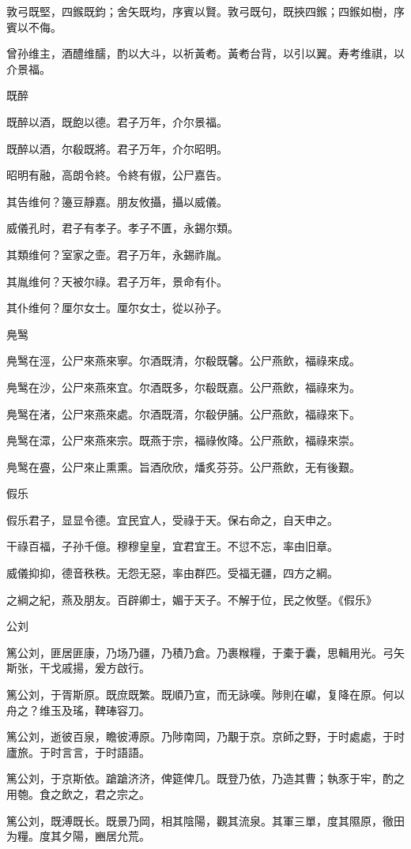 敦弓既堅，四鍭既鈞；舍矢既均，序賓以賢。敦弓既句，既挾四鍭；四鍭如樹，序賓以不侮。

曾孙维主，酒醴维醹，酌以大斗，以祈黃耇。黃耇台背，以引以翼。寿考维祺，以介景福。

既醉

既醉以酒，既飽以德。君子万年，介尔景福。

既醉以酒，尔殽既將。君子万年，介尔昭明。

昭明有融，高朗令終。令終有俶，公尸嘉告。

其告维何？籩豆靜嘉。朋友攸攝，攝以威儀。

威儀孔时，君子有孝子。孝子不匱，永錫尔類。

其類维何？室家之壸。君子万年，永錫祚胤。

其胤维何？天被尔祿。君子万年，景命有仆。

其仆维何？厘尔女士。厘尔女士，從以孙子。

鳧鹥

鳧鹥在涇，公尸來燕來寧。尔酒既清，尔殽既馨。公尸燕飲，福祿來成。

鳧鹥在沙，公尸來燕來宜。尔酒既多，尔殽既嘉。公尸燕飲，福祿來为。

鳧鹥在渚，公尸來燕來處。尔酒既湑，尔殽伊脯。公尸燕飲，福祿來下。

鳧鹥在潀，公尸來燕來宗。既燕于宗，福祿攸降。公尸燕飲，福祿來崇。

鳧鹥在亹，公尸來止熏熏。旨酒欣欣，燔炙芬芬。公尸燕飲，无有後艱。

假乐

假乐君子，显显令德。宜民宜人，受祿于天。保右命之，自天申之。

干祿百福，子孙千億。穆穆皇皇，宜君宜王。不愆不忘，率由旧章。

威儀抑抑，德音秩秩。无怨无惡，率由群匹。受福无疆，四方之綱。

之綱之紀，燕及朋友。百辟卿士，媚于天子。不解于位，民之攸墍。《假乐》

公刘

篤公刘，匪居匪康，乃场乃疆，乃積乃倉。乃裹糇糧，于橐于囊，思輯用光。弓矢斯张，干戈戚揚，爰方啟行。

篤公刘，于胥斯原。既庶既繁。既順乃宣，而无詠嘆。陟則在巘，复降在原。何以舟之？维玉及瑤，鞞琫容刀。

篤公刘，逝彼百泉，瞻彼溥原。乃陟南岡，乃覯于京。京師之野，于时處處，于时廬旅。于时言言，于时語語。

篤公刘，于京斯依。蹌蹌济济，俾筵俾几。既登乃依，乃造其曹；執豕于牢，酌之用匏。食之飲之，君之宗之。

篤公刘，既溥既长。既景乃岡，相其陰陽，觀其流泉。其軍三單，度其隰原，徹田为糧。度其夕陽，豳居允荒。

